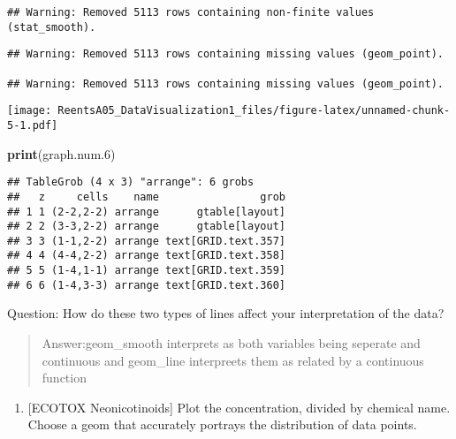 \documentclass[]{article}
\newenvironment{Shaded}{\begin{snugshade}}{\end{snugshade}}
\newcommand{\KeywordTok}[1]{\textcolor[rgb]{0.13,0.29,0.53}{\textbf{#1}}}
\newcommand{\DecValTok}[1]{\textcolor[rgb]{0.00,0.00,0.81}{#1}}
\newcommand{\CommentTok}[1]{\textcolor[rgb]{0.56,0.35,0.01}{\textit{#1}}}
\newcommand{\OperatorTok}[1]{\textcolor[rgb]{0.81,0.36,0.00}{\textbf{#1}}}
\newcommand{\NormalTok}[1]{#1}
\providecommand{\tightlist}{%
  \setlength{\itemsep}{0pt}\setlength{\parskip}{0pt}}
\begin{document}
\begin{verbatim}
## Warning: Removed 5113 rows containing non-finite values (stat_smooth).
\end{verbatim}

\begin{verbatim}
## Warning: Removed 5113 rows containing missing values (geom_point).

## Warning: Removed 5113 rows containing missing values (geom_point).
\end{verbatim}

\texttt{[image: ReentsA05\_DataVisualization1\_files/figure-latex/unnamed-chunk-5-1.pdf]}

\begin{Shaded}
\begin{Highlighting}[]
\KeywordTok{print}\NormalTok{(graph.num.}\DecValTok{6}\NormalTok{)}
\end{Highlighting}
\end{Shaded}

\begin{verbatim}
## TableGrob (4 x 3) "arrange": 6 grobs
##   z     cells    name                grob
## 1 1 (2-2,2-2) arrange      gtable[layout]
## 2 2 (3-3,2-2) arrange      gtable[layout]
## 3 3 (1-1,2-2) arrange text[GRID.text.357]
## 4 4 (4-4,2-2) arrange text[GRID.text.358]
## 5 5 (1-4,1-1) arrange text[GRID.text.359]
## 6 6 (1-4,3-3) arrange text[GRID.text.360]
\end{verbatim}

Question: How do these two types of lines affect your interpretation of
the data?

\begin{quote}
Answer:geom\_smooth interprets as both variables being seperate and
continuous and geom\_line interpreets them as related by a continuous
function
\end{quote}

\begin{enumerate}
\def\labelenumi{\arabic{enumi}.}
\setcounter{enumi}{6}
\tightlist
\item
  {[}ECOTOX Neonicotinoids{]} Plot the concentration, divided by
  chemical name. Choose a geom that accurately portrays the distribution
  of data points.
\end{enumerate}

\begin{Shaded}
\end{Shaded}
\end{document}
